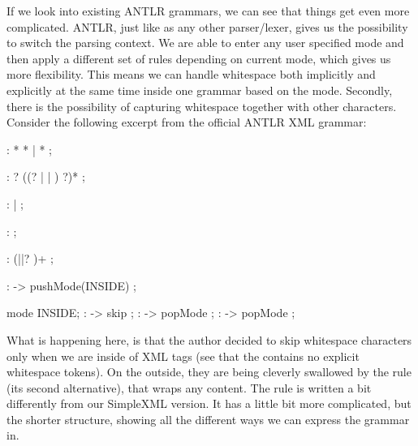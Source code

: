 If we look into existing ANTLR grammars, we can see that things get even more complicated.
ANTLR, just like as any other parser/lexer, gives us the possibility to switch the parsing context.
We are able to enter any user specified mode and then apply a different set of rules depending on current mode, which gives us more flexibility.
This means we can handle whitespace both implicitly and explicitly at the same time inside one grammar based on the mode.
Secondly, there is the possibility of capturing whitespace together with other characters.
Consider the following excerpt from the official ANTLR XML grammar:

\begin{antlr}
	     :   \literal{<}  * \literal{>} * \literal{</}  \literal{>}
	            |   \literal{<}  * \literal{/>}
	            ;

	     :   ?
                ((? |  | ) ?)* ;

	    :    |  ;

	        :   \regex{~[<&]+} ;

	      :   (\literal{ }||? )+ ;

	        :   \literal{<}             -> pushMode(INSIDE) ;

	mode INSIDE;
	           :          -> skip ;
	       :   \literal{<}             -> popMode ;
	 :   \literal{/>}            -> popMode ;
\end{antlr}

What is happening here, is that the author decided to skip whitespace characters only when we are inside of XML tags (see that the  contains no explicit whitespace tokens).
On the outside, they are being cleverly swallowed by the  rule (its second alternative), that wraps any content.
The  rule is written a bit differently from our SimpleXML version.
It has a little bit more complicated, but the shorter structure, showing all the different ways we can express the grammar in.
\\

